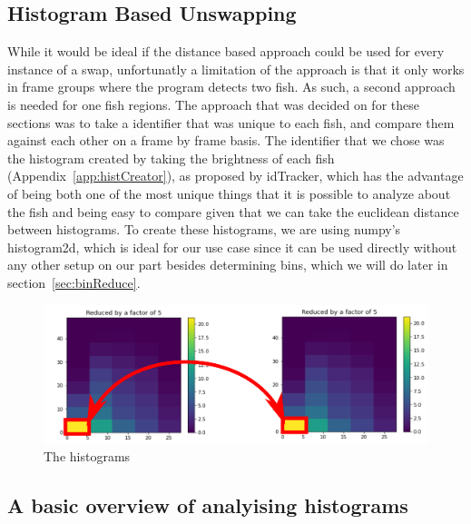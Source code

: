 \documentclass{article}
\begin{document}


\subsection{Histogram Based Unswapping}

While it would be ideal if the distance based approach could be used for every instance of a swap, unfortunatly a limitation of the approach is that it only works in frame groups where the program detects two fish. As such, a second approach is needed for one fish regions. The approach that was decided on for these sections was to take a identifier that was unique to each fish, and compare them against each other on a frame by frame basis. The identifier that we chose was the histogram created by taking the brightness of each fish (Appendix~\ref{app:histCreator}), as proposed by idTracker\cite{perez-escudero_idtracker_2014}, which has the advantage of being both one of the most unique things that it is possible to analyze about the fish and being easy to compare given that we can take the euclidean distance between histograms. To create these histograms, we are using numpy's histogram2d, which is ideal for our use case since it can be used directly without any other setup on our part besides determining bins, which we will do later in section~\ref{sec:binReduce}.

\begin{figure}[H]
	\centering
	\includegraphics[width=\linewidth]{twoHist}
	\caption{The histograms}
	\label{fig:singleHist}
\end{figure}

\subsection{A basic overview of analyising histograms}
\end{document}
